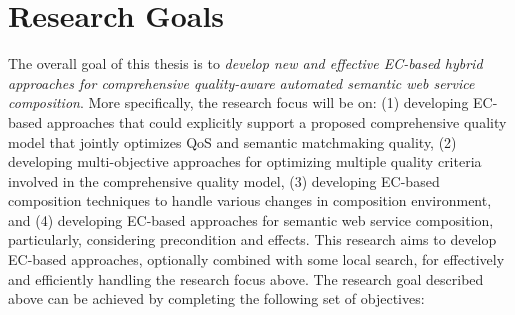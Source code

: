 \section{Research Goals}
The overall goal of this thesis is to \emph{develop new and effective EC-based hybrid approaches for comprehensive quality-aware automated semantic web service composition}. More specifically, the research focus will be on: (1) developing EC-based approaches that could explicitly support a proposed comprehensive quality model that jointly optimizes QoS and semantic matchmaking quality, (2) developing multi-objective approaches for optimizing multiple quality criteria involved in the comprehensive quality model, (3) developing EC-based composition techniques to handle various changes in composition environment, and  (4) developing EC-based approaches for semantic web service composition, particularly, considering precondition and effects. This research aims to develop EC-based approaches, optionally combined with some local search, for effectively and efficiently handling the research focus above. The research goal described above can be achieved by completing the following set of objectives:


